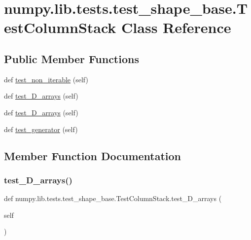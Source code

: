 \hypertarget{classnumpy_1_1lib_1_1tests_1_1test__shape__base_1_1TestColumnStack}{}\section{numpy.\+lib.\+tests.\+test\+\_\+shape\+\_\+base.\+Test\+Column\+Stack Class Reference}
\label{classnumpy_1_1lib_1_1tests_1_1test__shape__base_1_1TestColumnStack}
\subsection*{Public Member Functions}
\begin{DoxyCompactItemize}
\item 
def \hyperlink{classnumpy_1_1lib_1_1tests_1_1test__shape__base_1_1TestColumnStack_a52aa0016807bef6955149b2ab4ba382f}{test\+\_\+non\+\_\+iterable} (self)
\item 
def \hyperlink{classnumpy_1_1lib_1_1tests_1_1test__shape__base_1_1TestColumnStack_a0aa5968650e727fe3ec9ac24fb81da9c}{test\+\_\+D\+\_\+arrays} (self)
\item 
def \hyperlink{classnumpy_1_1lib_1_1tests_1_1test__shape__base_1_1TestColumnStack_a813df3ba3a54fc7f7d317e113bf77cdf}{test\+\_\+D\+\_\+arrays} (self)
\item 
def \hyperlink{classnumpy_1_1lib_1_1tests_1_1test__shape__base_1_1TestColumnStack_a7710a47e6bd0016e1c4c24967727903b}{test\+\_\+generator} (self)
\end{DoxyCompactItemize}


\subsection{Member Function Documentation}
\mbox{\label{classnumpy_1_1lib_1_1tests_1_1test__shape__base_1_1TestColumnStack_a0aa5968650e727fe3ec9ac24fb81da9c}} 
\subsubsection{\texorpdfstring{test\+\_\+D\+\_\+arrays()}{test\_1D\_arrays()}}
{\footnotesize\ttfamily def numpy.\+lib.\+tests.\+test\+\_\+shape\+\_\+base.\+Test\+Column\+Stack.\+test\+\_\+D\+\_\+arrays (\begin{DoxyParamCaption}\item[{}]{self }\end{DoxyParamCaption})}

